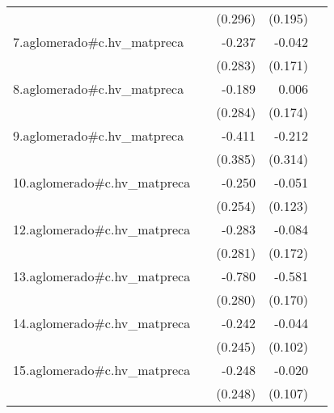 {\begin{longtable}{l*{4}{D{.}{.}{-1}}}
            &                     &     (0.296)         &     (0.195)         &                     \\
\addlinespace
7.aglomerado#c.hv\_matpreca&                     &      -0.237         &      -0.042         &                     \\
            &                     &     (0.283)         &     (0.171)         &                     \\
\addlinespace
8.aglomerado#c.hv\_matpreca&                     &      -0.189         &       0.006         &                     \\
            &                     &     (0.284)         &     (0.174)         &                     \\
\addlinespace
9.aglomerado#c.hv\_matpreca&                     &      -0.411         &      -0.212         &                     \\
            &                     &     (0.385)         &     (0.314)         &                     \\
\addlinespace
10.aglomerado#c.hv\_matpreca&                     &      -0.250         &      -0.051         &                     \\
            &                     &     (0.254)         &     (0.123)         &                     \\
\addlinespace
12.aglomerado#c.hv\_matpreca&                     &      -0.283         &      -0.084         &                     \\
            &                     &     (0.281)         &     (0.172)         &                     \\
\addlinespace
13.aglomerado#c.hv\_matpreca&                     &      -0.780\sym{**} &      -0.581\sym{***}&                     \\
            &                     &     (0.280)         &     (0.170)         &                     \\
\addlinespace
14.aglomerado#c.hv\_matpreca&                     &      -0.242         &      -0.044         &                     \\
            &                     &     (0.245)         &     (0.102)         &                     \\
\addlinespace
15.aglomerado#c.hv\_matpreca&                     &      -0.248         &      -0.020         &                     \\
            &                     &     (0.248)         &     (0.107)         &                     \\

\end{longtable}}
